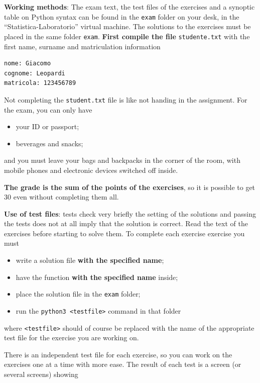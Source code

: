\textbf{Working methods}: The exam text, the test files of the exercises
and a synoptic table on Python syntax can be found in the \texttt{exam}
folder on your desk, in the ``Statistica-Laboratorio'' virtual machine.
The solutions to the exercises must be placed in the same folder
\texttt{exam}. \textbf{First compile the file} \texttt{studente.txt}
with the first name, surname and matriculation information

\begin{verbatim}
nome: Giacomo
cognome: Leopardi
matricola: 123456789
\end{verbatim}

Not completing the \texttt{student.txt} file is like not handing in the
assignment. For the exam, you can only have

\begin{itemize}
\tightlist
\item
  your ID or passport;
\item
  beverages and snacks;
\end{itemize}

and you must leave your bags and backpacks in the corner of the room,
with mobile phones and electronic devices switched off inside.

\textbf{The grade is the sum of the points of the exercises}, so it is
possible to get 30 even without completing them all.

\textbf{Use of test files}: tests check very briefly the setting of the
solutions and passing the tests does not at all imply that the solution
is correct. Read the text of the exercises before starting to solve
them. To complete each exercise exercise you must

\begin{itemize}
\tightlist
\item
  write a solution file \textbf{with the specified name};
\item
  have the function \textbf{with the specified name} inside;
\item
  place the solution file in the \texttt{exam} folder;
\item
  run the \texttt{python3\ \textless{}testfile\textgreater{}} command in
  that folder
\end{itemize}

where \texttt{\textless{}testfile\textgreater{}} should of course be
replaced with the name of the appropriate test file for the exercise you
are working on.

There is an independent test file for each exercise, so you can work on
the exercises one at a time with more ease. The result of each test is a
screen (or several screens) showing

